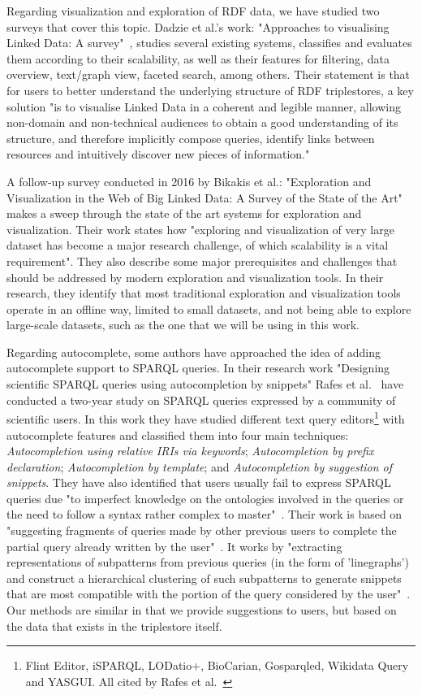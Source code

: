 Regarding visualization and exploration of RDF data, we have studied two surveys that cover this topic. Dadzie et al.'s work: "Approaches to visualising Linked Data: A survey"~\cite{Dadzie2011}, studies several existing systems, classifies and evaluates them according to their scalability, as well as their features for filtering, data overview, text/graph view, faceted search, among others. Their statement is that for users to better understand the underlying structure of RDF triplestores, a key solution "is to visualise Linked Data in a coherent and legible manner, allowing non-domain and non-technical audiences to obtain a good understanding of its structure, and therefore implicitly compose queries, identify links between resources and intuitively discover new pieces of information."

A follow-up survey conducted in 2016 by Bikakis et al.: "Exploration and Visualization in the Web of Big Linked Data: A Survey of the State of the Art"~\cite{Bikakis2016} makes a sweep through the state of the art systems for exploration and visualization. 
Their work states how "exploring and visualization of very large dataset has become a major research challenge, of which scalability is a vital requirement". They also describe some major prerequisites and challenges that should be addressed by modern exploration and visualization tools.
In their research, they identify that most traditional exploration and visualization tools operate in an offline way, limited to small datasets, and not being able to explore large-scale datasets, such as the one that we will be using in this work.

Regarding autocomplete, some authors have approached the idea of adding autocomplete support to SPARQL queries. 
In their research work "Designing scientific SPARQL queries using autocompletion by snippets" Rafes et al.~\cite{Rafes2018} have conducted a two-year study on SPARQL queries expressed by a community of scientific users. 
In this work they have studied different text query editors\footnote{Flint Editor, iSPARQL, LODatio+, BioCarian, Gosparqled, Wikidata Query and YASGUI. All cited by Rafes et al.~\cite{Rafes2018}} with autocomplete features and classified them into four main techniques: 
\textit{Autocompletion using relative IRIs via keywords}; 
\textit{Autocompletion by prefix declaration}; 
\textit{Autocompletion by template}; and 
\textit{Autocompletion by suggestion of snippets}. 
They have also identified that users usually fail to express SPARQL queries due "to imperfect knowledge on the ontologies involved in the queries or the need to follow a syntax rather complex to master"~\cite{Rafes2018}. 
Their work is based on "suggesting fragments of queries made by other previous users to complete the partial query already written by the user"~\cite{Rafes2018}.
It works by "extracting representations of subpatterns from previous queries (in the form of 'linegraphs') and construct a hierarchical clustering of such subpatterns to generate snippets that are most compatible with the portion of the query considered by the user"~\cite{Rafes2018}. Our methods are similar in that we provide suggestions to users, but based on the data that exists in the triplestore itself.

